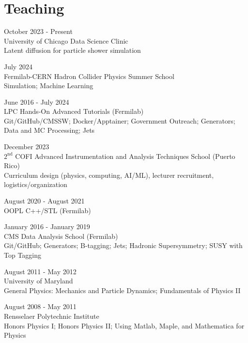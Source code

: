\section{Teaching}
\begin{description}[leftmargin=12pt,font=\normalfont\textit]
\item[Project Advisor] \hfill October 2023 - Present\\
University of Chicago Data Science Clinic\\
Latent diffusion for particle shower simulation
\item[Lecturer] \hfill July 2024\\
Fermilab-CERN Hadron Collider Physics Summer School\\
Simulation; Machine Learning
\item[Facilitator] \hfill June 2016 - July 2024\\
LPC Hands-On Advanced Tutorials (Fermilab)\\
Git/GitHub/CMSSW; Docker/Apptainer; Government Outreach; Generators; Data and MC Processing; Jets
\item[Co-director] \hfill December 2023\\
$2^{\text{nd}}$ COFI Advanced Instrumentation and Analysis Techniques School (Puerto Rico)\\
Curriculum design (physics, computing, AI/ML), lecturer recruitment, logistics/organization
\item[Teaching Assistant] \hfill August 2020 - August 2021\\
OOPL C++/STL (Fermilab)
\item[Facilitator] \hfill January 2016 - January 2019\\
CMS Data Analysis School (Fermilab)\\
Git/GitHub; Generators; B-tagging; Jets; Hadronic Supersymmetry; SUSY with Top Tagging
\item[Graduate Teaching Assistant] \hfill August 2011 - May 2012\\
University of Maryland\\
General Physics: Mechanics and Particle Dynamics; Fundamentals of Physics II
\item[Undergraduate Teaching Assistant] \hfill August 2008 - May 2011\\
Rensselaer Polytechnic Institute\\
Honors Physics I; Honors Physics II; Using Matlab, Maple, and Mathematica for Physics
\end{description}